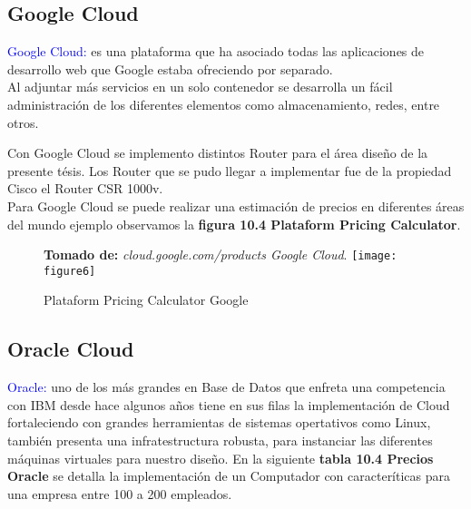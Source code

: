 \subsection{Google Cloud}

\textcolor{blue}{Google Cloud:} es una plataforma que ha asociado todas las aplicaciones de desarrollo web que Google 
estaba ofreciendo por separado.
\\
Al adjuntar más servicios en un solo contenedor se desarrolla un fácil administración de los diferentes elementos como almacenamiento, redes, entre otros.

Con Google Cloud se implemento distintos Router para el área diseño de la presente tésis. Los Router que se pudo llegar a implementar fue de la propiedad Cisco el Router CSR 1000v.
\\
Para Google Cloud se puede realizar una estimación de precios en diferentes áreas del mundo ejemplo observamos la \textbf{figura 10.4 Plataform Pricing Calculator}.

\begin{figure}[htbp]
 \footnotesize{\textbf{Tomado de:} \textit{cloud.google.com/products Google Cloud}.}
  \centering
  {\texttt{[image: figure6]}}%
  \caption{\footnotesize{Plataform Pricing Calculator Google}}
  \label{fig:fig2subfig}
\end{figure}

\subsection{Oracle Cloud}

\textcolor{blue}{Oracle:} uno de los más grandes en Base de Datos que enfreta una competencia con IBM desde hace algunos años tiene en sus filas la implementación de Cloud fortaleciendo con grandes herramientas de sistemas opertativos como Linux, también presenta una infratestructura robusta, para instanciar las diferentes máquinas virtuales para nuestro diseño. En la siguiente \textbf{tabla 10.4 Precios Oracle} se detalla la implementación de un Computador con caracteríticas para una empresa entre 100 a 200 empleados.

